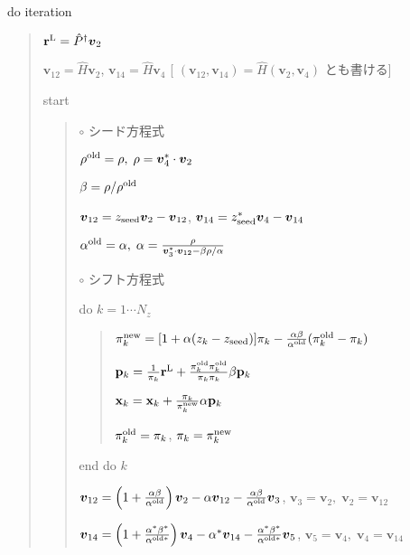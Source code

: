 \documentclass[letterpaper,10pt,dvipdfmx,openany]{sphinxmanual}
\begin{document}
do iteration
\begin{quote}

\({\bf r}^{\rm L} = {\hat P}^\dagger {\boldsymbol v}_2\)

\({\boldsymbol v}_{1 2} = {\hat H} {\boldsymbol v}_2\),
\({\boldsymbol v}_{1 4} = {\hat H} {\boldsymbol v}_4\)
{[} \(({\boldsymbol v}_{1 2}, {\boldsymbol v}_{1 4}) = {\hat H} ({\boldsymbol v}_2, {\boldsymbol v}_4)\) とも書ける{]}

 start
\begin{quote}

\(\circ\) シード方程式

\(\rho^{\rm old} = \rho,\; \rho = {\boldsymbol v}_4^* \cdot {\boldsymbol v}_2\)

\(\beta = \rho / \rho^{\rm old}\)

\({\boldsymbol v}_{1 2} = z_{\rm seed} {\boldsymbol v}_2 - {\boldsymbol v}_{1 2}\),
\({\boldsymbol v}_{1 4} = z_{\rm seed}^* {\boldsymbol v}_4 - {\boldsymbol v}_{1 4}\)

\(\alpha^{\rm old} = \alpha,\; \alpha = \frac{\rho}{{\boldsymbol v}_3^* \cdot {\boldsymbol v}_{1 2} - \beta \rho / \alpha }\)

\(\circ\) シフト方程式

do \(k = 1 \cdots N_z\)
\begin{quote}

\(\pi_k^{\rm new} = [1+\alpha(z_k-z_{\rm seed})]\pi_k - \frac{\alpha \beta}{\alpha^{\rm old}}(\pi_k^{\rm old} - \pi_k)\)

\({\bf p}_{k} = \frac{1}{\pi_k} {\bf r}^{\rm L} + \frac{\pi^{\rm old}_k \pi^{\rm old}_k}{\pi_k \pi_k} \beta {\bf p}_{k}\)

\({\bf x}_{k} = {\bf x}_{k} + \frac{\pi_k}{\pi_k^{\rm new}} \alpha {\bf p}_{k}\)

\(\pi_k^{\rm old} = \pi_k\), \(\pi_k = \pi_k^{\rm new}\)
\end{quote}

end do \(k\)

\({\boldsymbol v}_{1 2} = \left( 1 + \frac{\alpha \beta}{\alpha^{\rm old}} \right) {\boldsymbol v}_2 - \alpha {\boldsymbol v}_{1 2} - \frac{\alpha \beta}{\alpha^{\rm old}} {\boldsymbol v}_3\),
\({\boldsymbol v}_3 = {\boldsymbol v}_2,\; {\boldsymbol v}_2 = {\boldsymbol v}_{1 2}\)

\({\boldsymbol v}_{1 4} = \left( 1 + \frac{\alpha^* \beta^*}{\alpha^{{\rm old}*}} \right) {\boldsymbol v}_4 - \alpha^* {\boldsymbol v}_{1 4} - \frac{\alpha^* \beta^*}{\alpha^{{\rm old} *}} {\boldsymbol v}_5\),
\({\boldsymbol v}_5 = {\boldsymbol v}_4,\; {\boldsymbol v}_4 = {\boldsymbol v}_{1 4}\)


\end{quote}
\end{quote}
\end{document}
